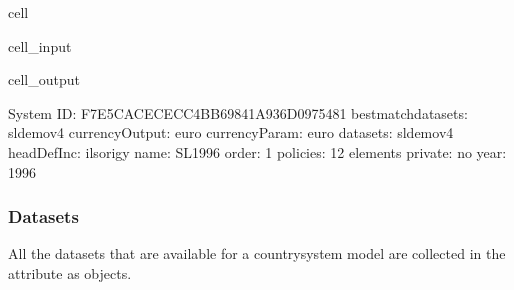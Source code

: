 \documentclass[letterpaper,10pt,english]{sphinxmanual}
\begin{document}
\begin{sphinxuseclass}{cell}
\begin{sphinxuseclass}{cell_input}
\begin{sphinxVerbatim}[commandchars=\\\{\}]
\PYG{p}{[}\PYG{p}{]}\PYG{p}{[}\PYG{p}{]}
\end{sphinxVerbatim}

\end{sphinxuseclass}
\begin{sphinxuseclass}{cell_output}
\begin{sphinxVerbatim}[commandchars=\\\{\}]
\PYGZhy{}\PYGZhy{}\PYGZhy{}\PYGZhy{}\PYGZhy{}\PYGZhy{}\PYGZhy{}\PYGZhy{}\PYGZhy{}\PYGZhy{}\PYGZhy{}\PYGZhy{}\PYGZhy{}\PYGZhy{}\PYGZhy{}\PYGZhy{}\PYGZhy{}\PYGZhy{}\PYGZhy{}\PYGZhy{}\PYGZhy{}\PYGZhy{}\PYGZhy{}\PYGZhy{}\PYGZhy{}\PYGZhy{}\PYGZhy{}\PYGZhy{}\PYGZhy{}\PYGZhy{}
System
\PYGZhy{}\PYGZhy{}\PYGZhy{}\PYGZhy{}\PYGZhy{}\PYGZhy{}\PYGZhy{}\PYGZhy{}\PYGZhy{}\PYGZhy{}\PYGZhy{}\PYGZhy{}\PYGZhy{}\PYGZhy{}\PYGZhy{}\PYGZhy{}\PYGZhy{}\PYGZhy{}\PYGZhy{}\PYGZhy{}\PYGZhy{}\PYGZhy{}\PYGZhy{}\PYGZhy{}\PYGZhy{}\PYGZhy{}\PYGZhy{}\PYGZhy{}\PYGZhy{}\PYGZhy{}
	 ID: \PYGZsq{}F7E5CACE\PYGZhy{}CECC\PYGZhy{}4BB6\PYGZhy{}9841\PYGZhy{}A936D0975481\PYGZsq{}
	 bestmatch\PYGZus{}datasets: sl\PYGZus{}demo\PYGZus{}v4
	 currencyOutput: \PYGZsq{}euro\PYGZsq{}
	 currencyParam: \PYGZsq{}euro\PYGZsq{}
	 datasets: sl\PYGZus{}demo\PYGZus{}v4
	 headDefInc: \PYGZsq{}ils\PYGZus{}origy\PYGZsq{}
	 name: \PYGZsq{}SL\PYGZus{}1996\PYGZsq{}
	 order: \PYGZsq{}1\PYGZsq{}
	 policies: 12 elements
	 private: \PYGZsq{}no\PYGZsq{}
	 year: \PYGZsq{}1996\PYGZsq{}
\end{sphinxVerbatim}

\end{sphinxuseclass}
\end{sphinxuseclass}

\subsubsection{Datasets}
\label{\detokenize{getstarted:datasets}}
\sphinxAtStartPar
All the datasets that are available for a country\sphinxhyphen{}system model are collected in the attribute  as  objects.
\end{document}
